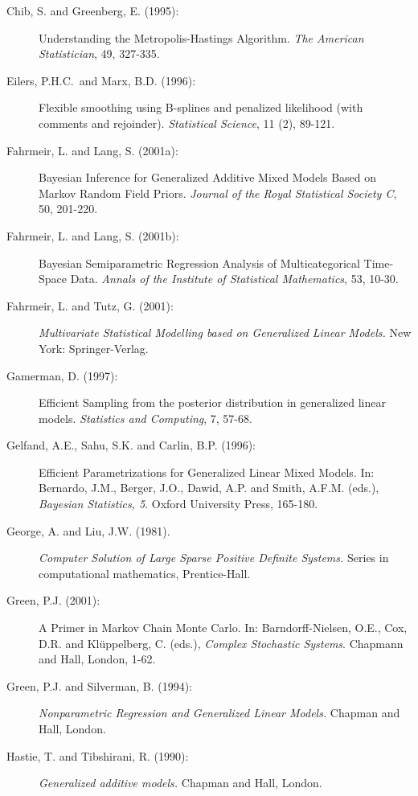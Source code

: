 \begin{description}
\item[Chib, S. and Greenberg, E. (1995):] Understanding the
Metropolis-Hastings Algorithm. {\em The American Statistician},
49, 327-335.

\item [Eilers, P.H.C.~and Marx, B.D. (1996):]
Flexible smoothing using B-splines and penalized likelihood (with
comments and rejoinder). {\it Statistical Science}, 11 (2),
89-121.

\item[Fahrmeir, L. and Lang, S. (2001a):]
Bayesian Inference for Generalized Additive Mixed Models Based on
Markov Random Field Priors. {\em Journal of the Royal Statistical
Society C}, 50, 201-220.

\item[Fahrmeir, L. and Lang, S. (2001b):] Bayesian Semiparametric Regression Analysis of Multicategorical
Time-Space Data. {\em Annals of the Institute of Statistical
Mathematics}, 53, 10-30.

\item[Fahrmeir, L. and Tutz, G. (2001):] {\em Multivariate Statistical
Modelling based on Generalized Linear Models.} New York:
Springer-Verlag.


\item[Gamerman, D. (1997):] Efficient Sampling from the posterior distribution
in generalized linear models. {\em Statistics and Computing}, 7,
57-68.

\item[Gelfand, A.E., Sahu, S.K. and Carlin, B.P. (1996):] Efficient Parametrizations for
Generalized Linear Mixed Models. In: Bernardo, J.M., Berger, J.O.,
Dawid, A.P. and Smith, A.F.M. (eds.), {\em Bayesian Statistics,
5}. Oxford University Press, 165-180.

\item[George, A. and Liu, J.W. (1981).] {\em Computer Solution of Large
Sparse Positive Definite Systems.} Series in computational
mathematics, Prentice-Hall.

\item[Green, P.J. (2001):] A Primer in Markov Chain Monte Carlo. In: Barndorff-Nielsen, O.E.,
Cox, D.R. and Kl\"{u}ppelberg, C. (eds.), {\em Complex Stochastic
Systems}. Chapmann and Hall, London, 1-62.

\item[Green, P.J. and Silverman, B. (1994):] {\em Nonparametric Regression and Generalized Linear Models.} Chapman
and Hall, London.

\item[Hastie, T. and Tibshirani, R. (1990):] {\em Generalized additive models.} Chapman and
Hall, London.


\end{description}
